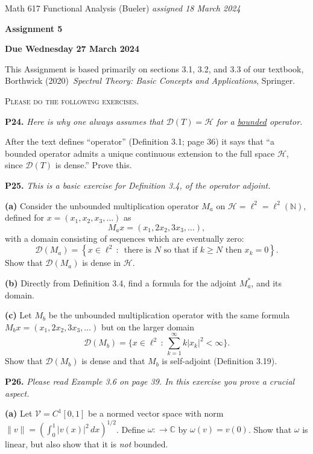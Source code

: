 \documentclass[12pt]{amsart}
\newcommand{\cD}{\mathcal{D}}
\newcommand{\cH}{\mathcal{H}}
\newcommand{\cV}{\mathcal{V}}
\newcommand{\CC}{\mathbb{C}}
\newcommand{\NN}{\mathbb{N}}
\newcommand{\prob}[1]{\bigskip\noindent\textbf{#1.}\quad }
\newcommand{\epart}[1]{\medskip\noindent\textbf{(#1)}\quad }
\begin{document}
\scriptsize \noindent Math 617 Functional Analysis (Bueler) \hfill \emph{assigned 18 March 2024}
\normalsize\medskip

\Large\centerline{\textbf{Assignment 5}}
\large
\medskip

\centerline{\textbf{Due Wednesday 27 March 2024}}
\medskip
\normalsize

\thispagestyle{empty}

\bigskip
\noindent This Assignment is based primarily on sections 3.1, 3.2, and 3.3 of our textbook, Borthwick (2020)~\emph{Spectral Theory: Basic Concepts and Applications}, Springer.

\medskip
\noindent \textsc{Please do the following exercises.}
\smallskip


\prob{P24}  \emph{Here is why one always assumes that $\cD(T) = \cH$ for a \underline{bounded} operator.}

\medskip \noindent After the text defines ``operator'' (Definition 3.1; page 36) it says that ``a bounded operator admits a unique continuous extension to the full space $\cH$, since $\cD(T)$ is dense.''  Prove this.


\prob{P25}  \emph{This is a basic exercise for Definition 3.4, of the operator adjoint.}

\epart{a} Consider the unbounded multiplication operator $M_a$ on $\cH=\ell^2=\ell^2(\NN)$, defined for $x=(x_1,x_2,x_3,\dots)$ as
	$$M_a x = (x_1, 2 x_2, 3 x_3, \dots),$$
with a domain consisting of sequences which are eventually zero:
	$$\cD(M_a) = \left\{x \in \ell^2\,:\,\text{ there is $N$ so that if $k\ge N$ then } x_k=0\right\}.$$
Show that $\cD(M_a)$ is dense in $\cH$.

\epart{b} Directly from Definition 3.4, find a formula for the adjoint $M_a^*$, and its domain.

\epart{c} Let $M_b$ be the unbounded multiplication operator with the same formula $M_b x = (x_1, 2 x_2, 3 x_3, \dots)$ but on the larger domain
    $$\cD(M_b) = \Big\{x \in \ell^2\,:\, \sum_{k=1}^\infty k|x_k|^2 < \infty\Big\}.$$
Show that $\cD(M_b)$ is dense and that $M_b$ is self-adjoint (Definition 3.19).


\prob{P26}  \emph{Please read Example 3.6 on page 39.  In this exercise you prove a crucial aspect.}

\epart{a} Let $\cV = C^1[0,1]$ be a normed vector space with norm $\|v\| = \left(\int_0^1 |v(x)|^2\,dx\right)^{1/2}$.  Define $\omega: \to \CC$ by $\omega(v) = v(0)$.  Show that $\omega$ is linear, but also show that it is \emph{not} bounded.
\end{document}
